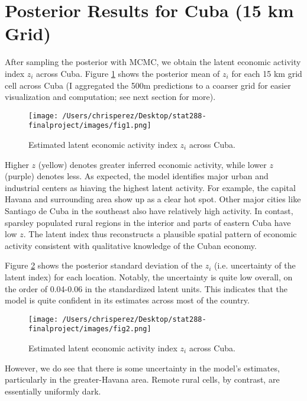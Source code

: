\documentclass[12pt]{article}
\begin{document}
\section{Posterior Results for Cuba (15 km Grid)}

After sampling the posterior with MCMC, we obtain the latent economic activity index $z_i$ across Cuba. Figure \ref{fig:posterior_map_round1} shows the posterior mean of $z_i$ for each 15 km grid cell across Cuba (I aggregated the 500m predictions to a coarser grid for easier visualization and computation; see next section for more). 

\begin{figure}[H]
  \centering
  \texttt{[image: /Users/chrisperez/Desktop/stat288-finalproject/images/fig1.png]}
  \caption{Estimated latent economic activity index $z_i$ across Cuba.}
  \label{fig:posterior_map_round1} 
\end{figure}

Higher $z$ (yellow) denotes greater inferred economic activity, while lower $z$ (purple) denotes less. As expected, the model identifies major urban and industrial centers as hiaving the highest latent activity. For example, the capital Havana and surrounding area show up as a clear hot spot. Other major cities like Santiago de Cuba in the southeast also have relatively high activity. In contast, sparsley populated rural regions in the interior and parts of eastern Cuba have low $z$. The latent index thus reconstructs a plausible spatial pattern of economic activity consistent with qualitative knowledge of the Cuban economy.

Figure \ref{fig:posterior_map_round1_uncertainty} shows the posterior standard deviation of the $z_i$ (i.e. uncertainty of the latent index) for each location. Notably, the uncertainty is quite low overall, on the order of 0.04-0.06 in the standardized latent units. This indicates that the model is quite confident in its estimates across most of the country. 

\begin{figure}[H]
  \centering
  \texttt{[image: /Users/chrisperez/Desktop/stat288-finalproject/images/fig2.png]}
  \caption{Estimated latent economic activity index $z_i$ across Cuba.}
  \label{fig:posterior_map_round1_uncertainty} 
\end{figure}

However, we do see that there is some uncertainty in the model's estimates, particularly in the greater-Havana area. Remote rural cells, by contrast, are essentially uniformly dark.
\end{document}
